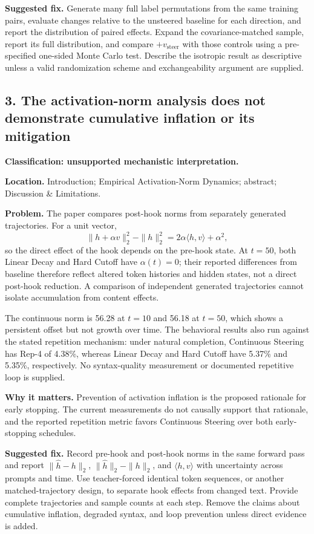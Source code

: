 \documentclass[11pt]{article}
\begin{document}
\textbf{Suggested fix.} Generate many full label permutations from the same training pairs, evaluate changes relative to the unsteered baseline for each direction, and report the distribution of paired effects.  Expand the covariance-matched sample, report its full distribution, and compare $+v_{\text{steer}}$ with those controls using a pre-specified one-sided Monte Carlo test.  Describe the isotropic result as descriptive unless a valid randomization scheme and exchangeability argument are supplied.

\subsection*{3. The activation-norm analysis does not demonstrate cumulative inflation or its mitigation}

\textbf{Classification: unsupported mechanistic interpretation.}

\textbf{Location.} Introduction; Empirical Activation-Norm Dynamics; abstract; Discussion \& Limitations.

\textbf{Problem.} The paper compares post-hook norms from separately generated trajectories.  For a unit vector,
\[
 \|h+\alpha v\|_2^2-\|h\|_2^2
 =2\alpha\langle h,v\rangle+\alpha^2,
\]
so the direct effect of the hook depends on the pre-hook state.  At $t=50$, both Linear Decay and Hard Cutoff have $\alpha(t)=0$; their reported differences from baseline therefore reflect altered token histories and hidden states, not a direct post-hook reduction.  A comparison of independent generated trajectories cannot isolate accumulation from content effects.

The continuous norm is 56.28 at $t=10$ and 56.18 at $t=50$, which shows a persistent offset but not growth over time.  The behavioral results also run against the stated repetition mechanism: under natural completion, Continuous Steering has Rep-4 of 4.38\%, whereas Linear Decay and Hard Cutoff have 5.37\% and 5.35\%, respectively.  No syntax-quality measurement or documented repetitive loop is supplied.

\textbf{Why it matters.} Prevention of activation inflation is the proposed rationale for early stopping.  The current measurements do not causally support that rationale, and the reported repetition metric favors Continuous Steering over both early-stopping schedules.

\textbf{Suggested fix.} Record pre-hook and post-hook norms in the same forward pass and report $\|\hat h-h\|_2$, $\|\hat h\|_2-\|h\|_2$, and $\langle h,v\rangle$ with uncertainty across prompts and time.  Use teacher-forced identical token sequences, or another matched-trajectory design, to separate hook effects from changed text.  Provide complete trajectories and sample counts at each step.  Remove the claims about cumulative inflation, degraded syntax, and loop prevention unless direct evidence is added.
\end{document}
